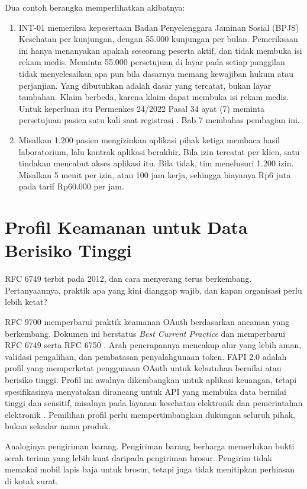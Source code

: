 Dua contoh berangka memperlihatkan akibatnya:
\begin{enumerate}
  \item INT-01 memeriksa kepesertaan Badan Penyelenggara Jaminan Sosial (BPJS) Kesehatan per kunjungan, dengan 55.000
        kunjungan per bulan. Pemeriksaan ini hanya menanyakan apakah seseorang peserta aktif, dan tidak membuka isi rekam medis.
        Meminta 55.000 persetujuan di layar pada setiap panggilan tidak menyelesaikan apa pun bila dasarnya memang kewajiban
        hukum atau perjanjian. Yang dibutuhkan adalah dasar yang tercatat, bukan layar tambahan. Klaim berbeda, karena klaim dapat
        membuka isi rekam medis. Untuk keperluan itu Permenkes 24/2022 Pasal 34 ayat (7) meminta persetujuan pasien satu kali
        saat registrasi \cite{permenkes24-2022}. Bab 7 membahas pembagian ini.
  \item Misalkan 1.200 pasien mengizinkan aplikasi pihak ketiga membaca hasil laboratorium, lalu kontrak aplikasi berakhir.
        Bila izin tercatat per klien, satu tindakan mencabut akses aplikasi itu. Bila tidak, tim menelusuri 1.200 izin.
        Misalkan 5 menit per izin, atau 100 jam kerja, sehingga biayanya Rp6 juta pada tarif Rp60.000 per jam.
\end{enumerate}

\section{Profil Keamanan untuk Data Berisiko Tinggi}

RFC 6749 terbit pada 2012, dan cara menyerang terus berkembang. Pertanyaannya, praktik apa yang kini dianggap wajib, dan
kapan organisasi perlu lebih ketat?

RFC 9700 memperbarui praktik keamanan OAuth berdasarkan ancaman yang berkembang. Dokumen ini berstatus \textit{Best
Current Practice} dan memperbarui RFC 6749 serta RFC 6750 \cite{rfc9700}. Arah penerapannya mencakup alur yang lebih aman,
validasi pengalihan, dan pembatasan penyalahgunaan token. FAPI 2.0 adalah profil yang memperketat penggunaan OAuth untuk
kebutuhan bernilai atau berisiko tinggi. Profil ini awalnya dikembangkan untuk aplikasi keuangan, tetapi spesifikasinya
menyatakan dirancang untuk API yang membuka data bernilai tinggi dan sensitif, misalnya pada layanan kesehatan elektronik
dan pemerintahan elektronik \cite{fapi2}. Pemilihan profil perlu mempertimbangkan dukungan seluruh pihak, bukan sekadar
nama produk.

Analoginya pengiriman barang. Pengiriman barang berharga memerlukan bukti serah terima yang lebih kuat daripada pengiriman
brosur. Pengirim tidak memakai mobil lapis baja untuk brosur, tetapi juga tidak menitipkan perhiasan di kotak surat.

